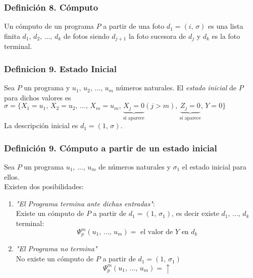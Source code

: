 \documentclass{article}
\newcommand{\comma}{,\,}                                %
\begin{document}
\subsubsection*{Definición 8. Cómputo}
Un cómputo de un programa $P$ a partir de una foto $d_1 = (i \comma \sigma)$ es una lista finita $d_1 \comma d_2 \comma ... \comma d_k$ de fotos siendo $d_{j+1}$ la foto sucesora de $d_j$ y $d_k$ es la foto terminal.

\subsubsection*{Definicion 9. Estado Inicial}
Sea $P$ un programa y $u_1 \comma u_2 \comma ... \comma u_m$ números naturales. El \emph{estado inicial} de $P$ para dichos valores es $\sigma = \{ X_1=u_1 \comma X_2=u_2 \comma ... \comma X_m = u_m \comma \underbrace{X_j = 0}_{\text{si aparece}} (j > m) \comma \underbrace{Z_j = 0}_{\text{si aparece}} \comma Y=0\}$
\\La descripción inicial es $d_1 = (1 \comma \sigma)$.

\subsubsection*{Definición 9. Cómputo a partir de un estado inicial}
Sea $P$ un programa $u_1 \comma ... \comma u_m$ de números naturales y $\sigma_1$ el estado inicial para ellos.
\\Existen dos posibilidades:
\begin{enumerate}
    \item \emph{"El Programa termina ante dichas entradas"}:
    \\Existe un cómputo de $P$ a partir de $d_1=(1\comma \sigma_1)$, es decir existe $d_1 \comma ... \comma d_k$ terminal:
    \begin{equation*}
        \Psi_p^m (u_1 \comma ... \comma u_m) = \text{ el valor de $Y$ en $d_k$}
    \end{equation*}
    \item \emph{"El Programa no termina"}
    \\No existe un cómputo de $P$ a partir de $d_1 = (1 \comma \sigma_1)$
    \begin{equation*}
        \Psi_p^m (u_1 \comma ... \comma u_m) = \uparrow
    \end{equation*}
\end{enumerate}
\end{document}
